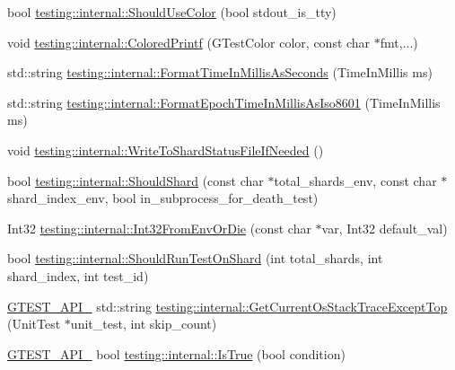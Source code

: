 \begin{DoxyCompactItemize}
bool \mbox{\hyperlink{namespacetesting_1_1internal_ac1db1b4603967a6c4404f31cbbac31a6}{testing\+::internal\+::\+Should\+Use\+Color}} (bool stdout\+\_\+is\+\_\+tty)
\item 
void \mbox{\hyperlink{namespacetesting_1_1internal_a1d9493ff218e622051c53094eb54bcd6}{testing\+::internal\+::\+Colored\+Printf}} (G\+Test\+Color color, const char $\ast$fmt,...)
\item 
std\+::string \mbox{\hyperlink{namespacetesting_1_1internal_a904485f27a54be8a5a92856e2d838797}{testing\+::internal\+::\+Format\+Time\+In\+Millis\+As\+Seconds}} (Time\+In\+Millis ms)
\item 
std\+::string \mbox{\hyperlink{namespacetesting_1_1internal_a5ef227c4a610e7ff638b12dfb25b068e}{testing\+::internal\+::\+Format\+Epoch\+Time\+In\+Millis\+As\+Iso8601}} (Time\+In\+Millis ms)
\item 
void \mbox{\hyperlink{namespacetesting_1_1internal_a19b35b39782d41e6ef76e1910a3a502e}{testing\+::internal\+::\+Write\+To\+Shard\+Status\+File\+If\+Needed}} ()
\item 
bool \mbox{\hyperlink{namespacetesting_1_1internal_a8688e48645d951b8e42b61d2e4b2890e}{testing\+::internal\+::\+Should\+Shard}} (const char $\ast$total\+\_\+shards\+\_\+env, const char $\ast$shard\+\_\+index\+\_\+env, bool in\+\_\+subprocess\+\_\+for\+\_\+death\+\_\+test)
\item 
Int32 \mbox{\hyperlink{namespacetesting_1_1internal_a7e70cddd54da21e2c2608613d51288e2}{testing\+::internal\+::\+Int32\+From\+Env\+Or\+Die}} (const char $\ast$var, Int32 default\+\_\+val)
\item 
bool \mbox{\hyperlink{namespacetesting_1_1internal_a437bd89f5bc532778d7467600e210395}{testing\+::internal\+::\+Should\+Run\+Test\+On\+Shard}} (int total\+\_\+shards, int shard\+\_\+index, int test\+\_\+id)
\item 
\mbox{\hyperlink{_obj__test_2lib_2googletest-release-1_88_81_2googletest_2include_2gtest_2internal_2gtest-port_8h_aa73be6f0ba4a7456180a94904ce17790}{G\+T\+E\+S\+T\+\_\+\+A\+P\+I\+\_\+}} std\+::string \mbox{\hyperlink{namespacetesting_1_1internal_aeb475922b8cd1e6c60ac052bbc396e62}{testing\+::internal\+::\+Get\+Current\+Os\+Stack\+Trace\+Except\+Top}} (Unit\+Test $\ast$unit\+\_\+test, int skip\+\_\+count)
\item 
\mbox{\hyperlink{_obj__test_2lib_2googletest-release-1_88_81_2googletest_2include_2gtest_2internal_2gtest-port_8h_aa73be6f0ba4a7456180a94904ce17790}{G\+T\+E\+S\+T\+\_\+\+A\+P\+I\+\_\+}} bool \mbox{\hyperlink{namespacetesting_1_1internal_a527b9bcc13669b9a16400c8514266254}{testing\+::internal\+::\+Is\+True}} (bool condition)

\end{DoxyCompactItemize}

